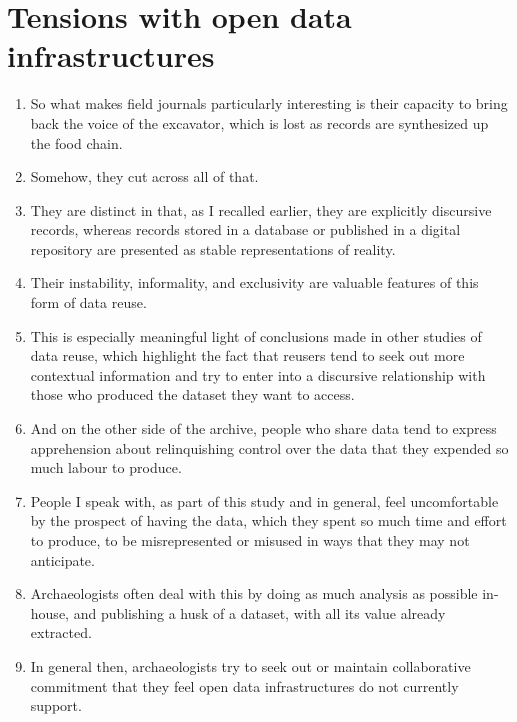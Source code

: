 \documentclass[12pt]{article}
\begin{document}
\section{Tensions with open data infrastructures}
\begin{enumerate}
  \item So what makes field journals particularly interesting is their capacity to bring back the voice of the excavator, which is lost as records are synthesized up the food chain.
  \item Somehow, they cut across all of that.
  \item They are distinct in that, as I recalled earlier, they are explicitly discursive records, whereas records stored in a database or published in a digital repository are presented as stable representations of reality.
  \item Their instability, informality, and exclusivity are valuable features of this form of data reuse.
  \item This is especially meaningful light of conclusions made in other studies of data reuse, which highlight the fact that reusers tend to seek out more contextual information and try to enter into a discursive relationship with those who produced the dataset they want to access.
  \item And on the other side of the archive, people who share data tend to express apprehension about relinquishing control over the data that they expended so much labour to produce.
  \item People I speak with, as part of this study and in general, feel uncomfortable by the prospect of having the data, which they spent so much time and effort to produce, to be misrepresented or misused in ways that they may not anticipate.
  \item Archaeologists often deal with this by doing as much analysis as possible in-house, and publishing a husk of a dataset, with all its value already extracted.
  \item In general then, archaeologists try to seek out or maintain collaborative commitment that they feel open data infrastructures do not currently support.
\end{enumerate}
\end{document}
